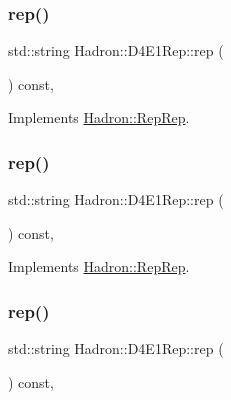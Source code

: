 \subsubsection{\texorpdfstring{rep()}{rep()}\hspace{0.1cm}{\footnotesize\ttfamily [3/5]}}
{\footnotesize\ttfamily std\+::string Hadron\+::\+D4\+E1\+Rep\+::rep (\begin{DoxyParamCaption}{ }\end{DoxyParamCaption}) const\hspace{0.3cm}{\ttfamily [inline]}, {\ttfamily [virtual]}}



Implements \mbox{\hyperlink{structHadron_1_1RepRep_ab3213025f6de249f7095892109575fde}{Hadron\+::\+Rep\+Rep}}.

\mbox{\label{structHadron_1_1D4E1Rep_add1afe88264c5adac1932f9880a6d980}} 
\subsubsection{\texorpdfstring{rep()}{rep()}\hspace{0.1cm}{\footnotesize\ttfamily [4/5]}}
{\footnotesize\ttfamily std\+::string Hadron\+::\+D4\+E1\+Rep\+::rep (\begin{DoxyParamCaption}{ }\end{DoxyParamCaption}) const\hspace{0.3cm}{\ttfamily [inline]}, {\ttfamily [virtual]}}



Implements \mbox{\hyperlink{structHadron_1_1RepRep_ab3213025f6de249f7095892109575fde}{Hadron\+::\+Rep\+Rep}}.

\mbox{\label{structHadron_1_1D4E1Rep_add1afe88264c5adac1932f9880a6d980}} 
\subsubsection{\texorpdfstring{rep()}{rep()}\hspace{0.1cm}{\footnotesize\ttfamily [5/5]}}
{\footnotesize\ttfamily std\+::string Hadron\+::\+D4\+E1\+Rep\+::rep (\begin{DoxyParamCaption}{ }\end{DoxyParamCaption}) const\hspace{0.3cm}{\ttfamily [inline]}, {\ttfamily [virtual]}}



